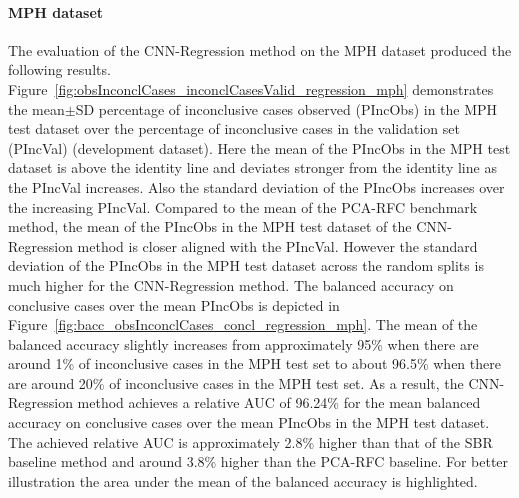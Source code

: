 
\paragraph{MPH dataset}

The evaluation of the CNN-Regression method on the MPH dataset produced the following results.
Figure~\ref{fig:obsInconclCases_inconclCasesValid_regression_mph} demonstrates
the mean$\pm$SD percentage of inconclusive cases observed (PIncObs) in the MPH test dataset 
over the percentage of inconclusive cases in the validation set (PIncVal) (development dataset).
Here the mean of the PIncObs in the MPH test dataset is above the identity line 
and deviates stronger from the identity line as the PIncVal increases.
Also the standard deviation of the PIncObs increases over the increasing PIncVal.
Compared to the mean of the PCA-RFC benchmark method, 
the mean of the PIncObs in the MPH test dataset of the CNN-Regression method is closer aligned with the PIncVal.
However the standard deviation of the PIncObs in the MPH test dataset across the random splits 
is much higher for the CNN-Regression method.
The balanced accuracy on conclusive cases over the mean PIncObs 
is depicted in Figure~\ref{fig:bacc_obsInconclCases_concl_regression_mph}.
The mean of the balanced accuracy slightly increases from approximately 95\% 
when there are around 1\% of inconclusive cases in the MPH test set to about 96.5\% 
when there are around 20\% of inconclusive cases in the MPH test set.
As a result, the CNN-Regression method achieves a relative AUC of 96.24\% for the mean balanced accuracy on conclusive cases 
over the mean PIncObs in the MPH test dataset.
The achieved relative AUC is approximately 2.8\% higher than that of the SBR baseline method 
and around 3.8\% higher than the PCA-RFC baseline.
For better illustration the area under the mean of the balanced accuracy is highlighted.


